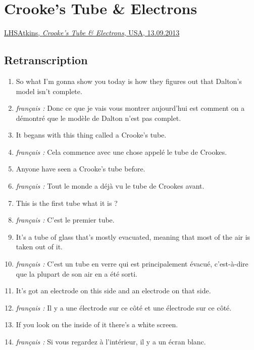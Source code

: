 \documentclass[../main.tex]{subfiles}
\begin{document}
\section{Crooke's Tube & Electrons}
\href{https://www.youtube.com/watch?v=Ka3v5dIQGOI}{LHSAtkins, \textit{Crooke's Tube & Electrons}, USA, 13.09.2013}\\
\subsection{Retranscription}
\begin{enumerate}
    \item So what I'm gonna show you today is how they figures out that Dalton's model isn't complete.
    \item \hspace*{1cm} \emph{ français :} Donc ce que je vais vous montrer aujourd'hui est comment on a démontré que le modèle de Dalton n'est pas complet.
    \item It begans with this thing called a Crooke's tube.
     \item \hspace*{1cm} \emph{ français :} Cela commence avec une chose appelé le tube de Crookes.
    \item Anyone have seen a Crooke's tube before.
      \item \hspace*{1cm} \emph{ français :} Tout le monde a déjà vu le tube de  Crookes avant.
    \item This is the first tube what it is ?
     \item \hspace*{1cm} \emph{ français  :} C'est le premier tube.
    \item It's a tube of glass that's mostly evacuated, meaning that most of the air is taken out of it.
     \item \hspace*{1cm} \emph{ français :} C'est un tube en verre qui est principalement évacué, c'est-à-dire que la plupart de son air en a été sorti.
    \item It's got an electrode on this side and an electrode on that side.
     \item \hspace*{1cm} \emph{ français :} Il y a une électrode sur ce côté et une électrode sur ce côté.
    \item If you look on the inside of it there's a white screen.
     \item \hspace*{1cm} \emph{ français :} Si vous regardez à l'intérieur, il y a un écran blanc.

\end{enumerate}
\end{document}
